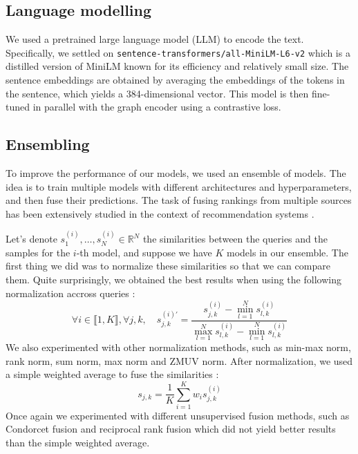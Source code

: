 \documentclass[switch, 11pt]{article}
\newcommand{\R}{\mathbb{R}}
\begin{document}
\begin{multicols}{2}
    \subsection{Language modelling}

    We used a pretrained large language model (LLM) to encode the text. Specifically, we settled on \texttt{sentence-transformers/all-MiniLM-L6-v2} which is a distilled version of MiniLM \cite{wang-2020} known for its efficiency and relatively small size. The sentence embeddings are obtained by averaging the embeddings of the tokens in the sentence, which yields a 384-dimensional vector. This model is then fine-tuned in parallel with the graph encoder using a contrastive loss.

    \subsection{Ensembling}

    To improve the performance of our models, we used an ensemble of models. The idea is to train multiple models with different architectures and hyperparameters, and then fuse their predictions. The task of fusing rankings from multiple sources has been extensively studied in the context of recommendation systems \cite{bachanowski-2023}.

    Let's denote $s_1^{(i)}, \dots, s_N^{(i)}\in\R^N$ the similarities between the queries and the samples for the $i$-th model, and suppose we have $K$ models in our ensemble. The first thing we did was to normalize these similarities so that we can compare them. Quite surprisingly, we obtained the best results when using the following normalization accross queries :
    \begin{equation}
        \forall i\in \llbracket1, K\rrbracket, \forall j,k, \quad s_{j,k}^{(i)'} = \frac{s_{j,k}^{(i)} - \min_{l=1}^N s_{l,k}^{(i)}}{\max_{l=1}^N s_{l,k}^{(i)} - \min_{l=1}^N s_{l,k}^{(i)}}
    \end{equation}
    We also experimented with other normalization methods, such as min-max norm, rank norm, sum norm, max norm and ZMUV norm. After normalization, we used a simple weighted average to fuse the similarities :
    \begin{equation}
        s_{j,k} = \frac{1}{K}\sum_{i=1}^K w_i s_{j,k}^{(i)}
    \end{equation}
    Once again we experimented with different unsupervised fusion methods, such as Condorcet fusion \cite{montague-2002} and reciprocal rank fusion \cite{cormack-2009} which did not yield better results than the simple weighted average.


\end{multicols}
\end{document}
